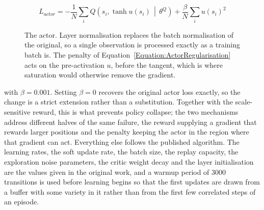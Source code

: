 \begin{equation}
L_{actor} = -\frac{1}{N}\sum_{i} Q\!\left(s_i, \tanh u(s_i) \,\middle|\, \theta^{Q}\right) + \frac{\beta}{N}\sum_{i} u(s_i)^2
\label{Equation:ActorRegularisation}
\end{equation}

\begin{figure}[htb!]
\centering
{}
\caption{The actor. Layer normalisation replaces the batch normalisation of the original, so a single observation is processed exactly as a training batch is. The penalty of Equation~\ref{Equation:ActorRegularisation} acts on the pre-activation $u$, before the tangent, which is where saturation would otherwise remove the gradient.}
\label{Figure:ActorNetwork}
\end{figure}

with $\beta = 0.001$. Setting $\beta = 0$ recovers the original actor loss exactly, so the change is a strict extension rather than a substitution. Together with the scale-sensitive reward, this is what prevents policy collapse; the two mechanisms address different halves of the same failure, the reward supplying a gradient that rewards larger positions and the penalty keeping the actor in the region where that gradient can act. Everything else follows the published algorithm. The learning rates, the soft update rate, the batch size, the replay capacity, the exploration noise parameters, the critic weight decay and the layer initialisation are the values given in the original work, and a warmup period of $3000$ transitions is used before learning begins so that the first updates are drawn from a buffer with some variety in it rather than from the first few correlated steps of an episode.